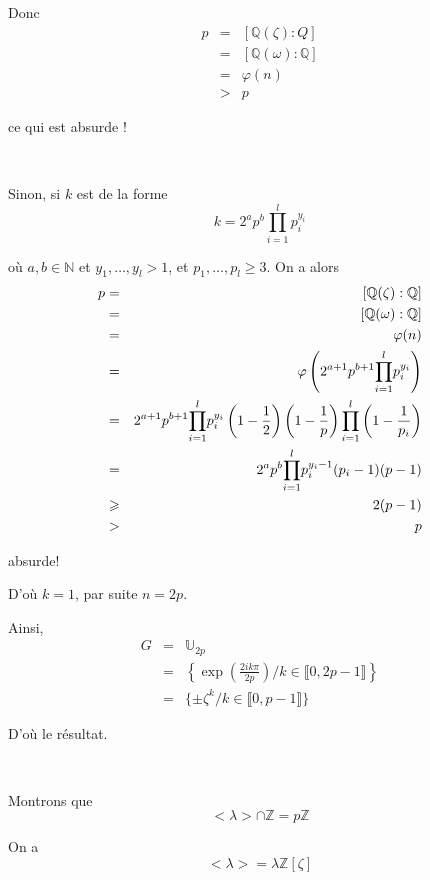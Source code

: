 Donc
\begin{eqnarray*}
  p & = & [\mathbb{Q} (\zeta) : Q]\\
  & = & [\mathbb{Q} (\omega) : \mathbb{Q}]\\
  & = & \varphi (n)\\
  & > & p
\end{eqnarray*}


ce qui est absurde !

\

Sinon, si $k$ est de la forme
\[ k = 2^a p^b \underset{i = 1}{\overset{l}{\prod}} p^{y_i}_i \]


o{\`u} $a, b \in \mathbb{N}$ et $y_1, \ldots, y_l > 1$, et $p_1, \ldots, p_l
\geqslant 3$. On a alors
\begin{eqnarray*}
  p & = & [\mathbb{Q} (\zeta) : \mathbb{Q}]\\
  & = & [\mathbb{Q} (\omega) : \mathbb{Q}]\\
  & = & \varphi (n)\\
  & = & \varphi \left( 2^{a + 1} p^{b + 1} \underset{i =
  1}{\overset{l}{\prod}} p^{y_i}_i \right)\\
  & = & \boldsymbol{} 2^{a + 1} p^{b + 1} \underset{i = 1}{\overset{l}{\prod}}
  p^{y_i}_i \left( 1 - \frac{1}{2} \right) \left( 1 - \frac{1}{p} \right)
  \underset{i = 1}{\overset{l}{\prod}} \left( 1 - \frac{1}{p_i} \right)\\
  & = & 2^a p^b \underset{i = 1}{\overset{l}{\prod}} p^{y_i - 1}_i (p_i - 1)
  (p - 1)\\
  & \geqslant & 2 (p - 1)\\
  & > & p
\end{eqnarray*}


absurde!

D'o{\`u} $k = 1$, par suite $n = 2 p$.

Ainsi,
\begin{eqnarray*}
  G & = & \mathbb{U}_{2 p}\\
  & = & \left\{ \exp \left( \frac{2 i k \pi}{2 p} \right) / k \in \llbracket
  0, 2 p - 1 \rrbracket \right\}\\
  & = & \{ \pm \zeta^k / k \in \llbracket 0, p - 1 \rrbracket \}
\end{eqnarray*}


D'o{\`u} le r{\'e}sultat.

\

 Montrons que
\[ < \lambda > \cap \mathbb{Z}= p\mathbb{Z} \]


On a
\[ < \lambda > = \lambda \mathbb{Z} [\zeta] \]


